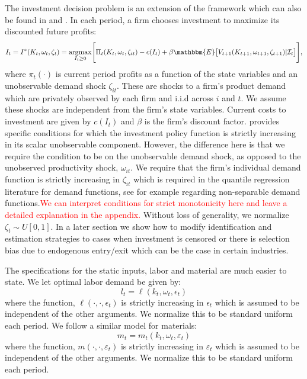 \documentclass{article}
\begin{document}
The investment decision problem is an extension of the \cite{Ericson1995} framework which can also be found in \cite{Hu2013} and \cite{Ackerberg2007}. In each period, a firm chooses investment to maximize its discounted future profits:
\begin{equation} \label{valuefn}
I_{t}=I^{*}(K_{t}, \omega_{t}, \zeta_{t})=\underset{I_{t}\geq 0}{\operatorname{argmax}}\Bigg[\Pi_{t}(K_{t}, \omega_{t}, \zeta_{it})-c(I_{t})+\beta\mathbbm{E}\big[V_{t+1}(K_{t+1}, \omega_{t+1}, \zeta_{t+1})|\mathcal{I}_{t}\big]\Bigg],
\end{equation}
where $\pi_{t}(\cdot)$ is current period profits as a function of the state variables and an unobservable demand shock $\zeta_{it}$. These are shocks to a firm's product demand which are privately observed by each firm and i.i.d across $i$ and $t$. We assume these shocks are independent from the firm's state variables. Current costs to investment are given by $c(I_{t})$ and $\beta$ is the firm's discount factor. \cite{Pakesa} provides specific conditions for which the investment policy function is strictly increasing in its scalar unobservable component. However, the difference here is that we require the condition to be on the unobservable demand shock, as opposed to the unobserved productivity shock, $\omega_{it}$. We require that the firm's individual demand function is strictly increasing in $\zeta_{it}$ which is required in the quantile regression literature for demand functions, see for example \citep{Blundell2017} regarding non-separable demand functions.\textcolor{red}{We can interpret conditions for strict monotonicity here and leave a detailed explanation in the appendix.} Without loss of generality, we normalize $\zeta_{t}\sim U[0,1]$. In a later section we show how to modify identification and estimation strategies to cases when investment is censored or there is selection bias due to endogenous entry/exit which can be the case in certain industries.

The specifications for the static inputs, labor and material are much easier to state. We let optimal labor demand be given by:
\begin{equation} \label{labordemand}
l_{t}=\ell(k_{t}, \omega_{t}, \epsilon_{t})
\end{equation}
where the function, $\ell(\cdot, \cdot, \epsilon_{t})$ is strictly increasing in $\epsilon_{t}$ which is assumed to be independent of the other arguments. We normalize this to be standard uniform each period. We follow a similar model for materials:
\begin{equation} \label{matdemand}
m_{t}=m_{t}(k_{t}, \omega_{t}, \varepsilon_{t})
\end{equation}
where the function, $m(\cdot, \cdot, \varepsilon_{t})$ is strictly increasing in $\varepsilon_{t}$ which is assumed to be independent of the other arguments. We normalize this to be standard uniform each period.
\end{document}
